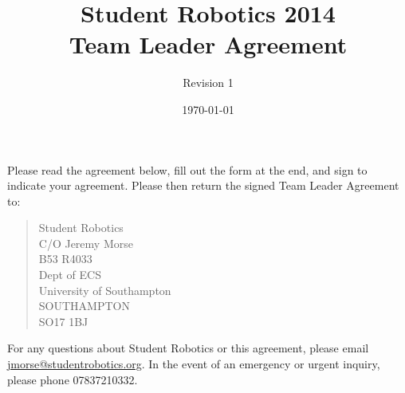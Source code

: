 \documentclass[a4paper, 11pt]{scrartcl}
\title {Student Robotics 2014\\ Team Leader Agreement}
\author{Revision 1}
\date{\today}
\begin{document}
\maketitle

\paragraph{}

Please read the agreement below, fill out the form at the end, and sign to
indicate your agreement. Please then return the signed Team Leader Agreement to:
\begin{quote}
	Student Robotics \\
	C/O Jeremy Morse \\
	B53 R4033 \\
	Dept of ECS \\
	University of Southampton \\
	SOUTHAMPTON \\
	SO17 1BJ
\end{quote}

For any questions about Student Robotics or this agreement, please email
\url{jmorse@studentrobotics.org}. In the event of an emergency or urgent
inquiry, please phone 07837210332.

\paragraph{}
\end{document}
